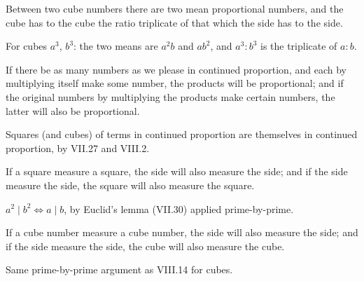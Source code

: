 \begin{claim}
\label{prop:VIII.12}
Between two cube numbers there are two mean proportional numbers,
and the cube has to the cube the ratio triplicate of that which the
side has to the side.
\end{claim}
\begin{evidence}
\label{ev:VIII.12}
For cubes $a^3$, $b^3$: the two means are $a^2 b$ and $a b^2$, and
$a^3 : b^3$ is the triplicate of $a : b$.
\end{evidence}

\begin{claim}
\label{prop:VIII.13}
If there be as many numbers as we please in continued proportion, and
each by multiplying itself make some number, the products will be
proportional; and if the original numbers by multiplying the products
make certain numbers, the latter will also be proportional.
\end{claim}
\begin{evidence}
\label{ev:VIII.13}
Squares (and cubes) of terms in continued proportion are themselves
in continued proportion, by VII.27 and VIII.2.
\end{evidence}

\begin{claim}
\label{prop:VIII.14}
If a square measure a square, the side will also measure the side;
and if the side measure the side, the square will also measure the
square.
\end{claim}
\begin{evidence}
\label{ev:VIII.14}
$a^2 \mid b^2 \iff a \mid b$, by Euclid's lemma (VII.30) applied
prime-by-prime.
\end{evidence}

\begin{claim}
\label{prop:VIII.15}
If a cube number measure a cube number, the side will also measure
the side; and if the side measure the side, the cube will also
measure the cube.
\end{claim}
\begin{evidence}
\label{ev:VIII.15}
Same prime-by-prime argument as VIII.14 for cubes.
\end{evidence}

